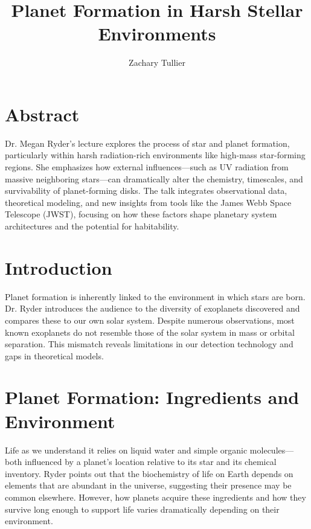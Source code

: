 \documentclass[12pt]{article}
\begin{document}
\singlespacing  %
\title{Planet Formation in Harsh Stellar Environments}

\author[1]{Zachary Tullier}
\date{}
\maketitle

\section*{Abstract}
Dr. Megan Ryder’s lecture explores the process of star and planet formation, particularly within harsh radiation-rich environments like high-mass star-forming regions. She emphasizes how external influences---such as UV radiation from massive neighboring stars---can dramatically alter the chemistry, timescales, and survivability of planet-forming disks. The talk integrates observational data, theoretical modeling, and new insights from tools like the James Webb Space Telescope (JWST), focusing on how these factors shape planetary system architectures and the potential for habitability.

\section*{Introduction}
Planet formation is inherently linked to the environment in which stars are born. Dr. Ryder introduces the audience to the diversity of exoplanets discovered and compares these to our own solar system. Despite numerous observations, most known exoplanets do not resemble those of the solar system in mass or orbital separation. This mismatch reveals limitations in our detection technology and gaps in theoretical models.

\section*{Planet Formation: Ingredients and Environment}
Life as we understand it relies on liquid water and simple organic molecules---both influenced by a planet's location relative to its star and its chemical inventory. Ryder points out that the biochemistry of life on Earth depends on elements that are abundant in the universe, suggesting their presence may be common elsewhere. However, how planets acquire these ingredients and how they survive long enough to support life varies dramatically depending on their environment.
\end{document}
